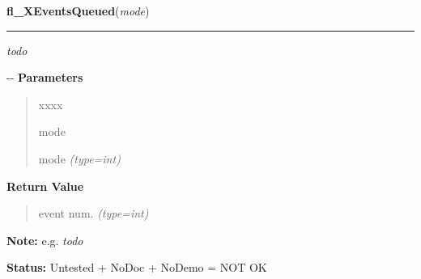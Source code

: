 \hspace{.8\funcindent}\begin{boxedminipage}{\funcwidth}

    \raggedright \textbf{fl\_XEventsQueued}(\textit{mode})

    \vspace{-1.5ex}

    \rule{\textwidth}{0.5\fboxrule}
\setlength{\parskip}{2ex}

\emph{todo}

-{}-
\setlength{\parskip}{1ex}
      \textbf{Parameters}
      \vspace{-1ex}

      \begin{quote}
        \begin{Ventry}{xxxx}

          \item[mode]


mode
            {\it (type=int)}

        \end{Ventry}

      \end{quote}

      \textbf{Return Value}
    \vspace{-1ex}

      \begin{quote}

event num.
      {\it (type=int)}

      \end{quote}

\textbf{Note:} 
e.g. \emph{todo}


\textbf{Status:} 
Untested + NoDoc + NoDemo = NOT OK


    \end{boxedminipage}

    \label{xformslib:flxbasic:fl_XPutBackEvent}

    \vspace{0.5ex}

